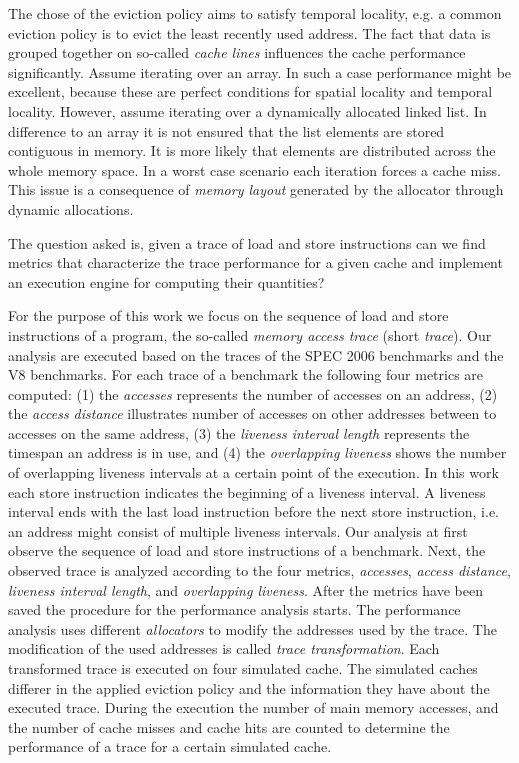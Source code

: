 \documentclass[onecolumn, openright, master, english, signatures]{dbrgrptt}
\begin{document}
The chose of the eviction policy aims to satisfy temporal locality, e.g. a common eviction policy is to evict the least recently used address.
%
The fact that data is grouped together on so-called \emph{cache lines} influences the cache performance significantly.
Assume iterating over an array.
In such a case performance might be excellent, because these are perfect conditions for spatial locality and temporal locality.
However, assume iterating over a dynamically allocated linked list.
In difference to an array it is not ensured that the list elements are stored contiguous in memory.
It is more likely that elements are distributed across the whole memory space.
In a worst case scenario each iteration forces a cache miss.
This issue is a consequence of \emph{memory layout} generated by the allocator through dynamic allocations.

The question asked is, given a trace of load and store instructions can we find metrics that characterize the trace performance for a given cache and implement an execution engine for computing their quantities?

For the purpose of this work we focus on the sequence of load and store instructions of a program, the so-called \emph{memory access trace} (short \emph{trace}).
Our analysis are executed based on the traces of the SPEC 2006 benchmarks and the V8 benchmarks.
For each trace of a benchmark the following four metrics are computed:
(1) the \emph{accesses} represents the number of accesses on an address,
(2) the \emph{access distance} illustrates number of accesses on other addresses between to accesses on the same address,
(3) the \emph{liveness interval length} represents the timespan an address is in use, and
(4) the \emph{overlapping liveness} shows the number of overlapping liveness intervals at a certain point of the execution.
In this work each store instruction indicates the beginning of a liveness interval.
A liveness interval ends with the last load instruction before the next store instruction, i.e. an address might consist of multiple liveness intervals.
%
Our analysis at first observe the sequence of load and store instructions of a benchmark.
Next, the observed trace is analyzed according to the four metrics, \emph{accesses}, \emph{access distance}, \emph{liveness interval length}, and \emph{overlapping liveness}.
After the metrics have been saved the procedure for the performance analysis starts.
The performance analysis uses different \emph{allocators} to modify the addresses used by the trace.
The modification of the used addresses is called \emph{trace transformation}.
Each transformed trace is executed on four simulated cache.
The simulated caches differer in the applied eviction policy and the information they have about the executed trace.
During the execution the number of main memory accesses, and the number of cache misses and cache hits are counted to determine the performance of a trace for a certain simulated cache.
\end{document}
